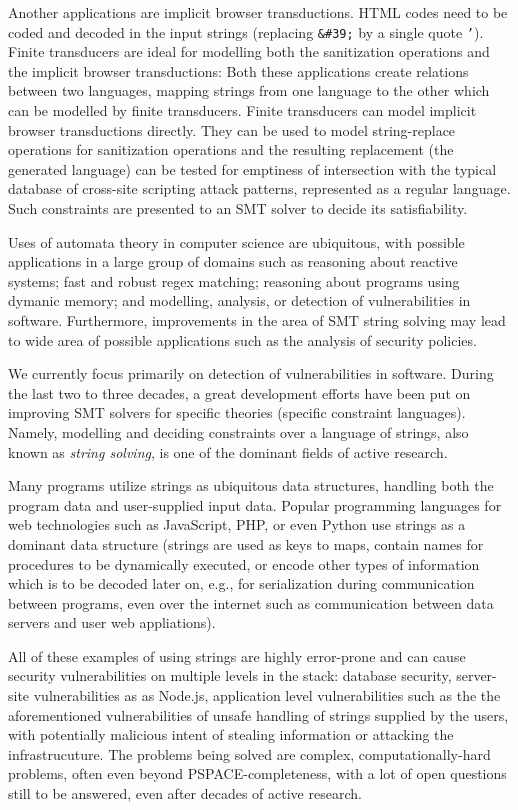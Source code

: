 Another applications are implicit browser transductions.
HTML codes need to be coded and decoded in the input strings (replacing \texttt{\&\#39;} by a single quote \texttt{'}).
Finite transducers are ideal for modelling both the sanitization operations and the implicit browser transductions:
Both these applications create relations between two languages, mapping strings from one language to the other which can be modelled by finite transducers.
Finite transducers can model implicit browser transductions directly.
They can be used to model string-replace operations for sanitization operations and the resulting replacement (the generated language) can be tested for emptiness of intersection with the typical database of cross-site scripting attack patterns, represented as a regular language.
Such constraints are presented to an SMT solver to decide its satisfiability.

Uses of automata theory in computer science are ubiquitous, with possible applications in a large group of domains such as reasoning about reactive systems; fast and robust regex matching; reasoning about programs using dymanic memory; and modelling, analysis, or detection of vulnerabilities in software.
Furthermore, improvements in the area of SMT string solving may lead to wide area of possible applications such as the analysis of security policies.

We currently focus primarily on detection of vulnerabilities in software.
During the last two to three decades, a great development efforts have been put on improving SMT solvers for specific theories (specific constraint languages).
Namely, modelling and deciding constraints over a language of strings, also known as \emph{string solving}, is one of the dominant fields of active research.

Many programs utilize strings as ubiquitous data structures, handling both the program data and user-supplied input data.
Popular programming languages for web technologies such as JavaScript, PHP, or even Python use strings as a dominant data structure (strings are used as keys to maps, contain names for procedures to be dynamically executed, or encode other types of information which is to be decoded later on, e.g., for serialization during communication between programs, even over the internet such as communication between data servers and user web appliations).

All of these examples of using strings are highly error-prone and can cause security vulnerabilities on multiple levels in the stack: database security, server-site vulnerabilities as as Node.js, application level vulnerabilities such as the the aforementioned vulnerabilities of unsafe handling of strings supplied by the users, with potentially malicious intent of stealing information or attacking the infrastrucuture.
The problems being solved are complex, computationally-hard problems, often even beyond PSPACE-completeness, with a lot of open questions still to be answered, even after decades of active research.

